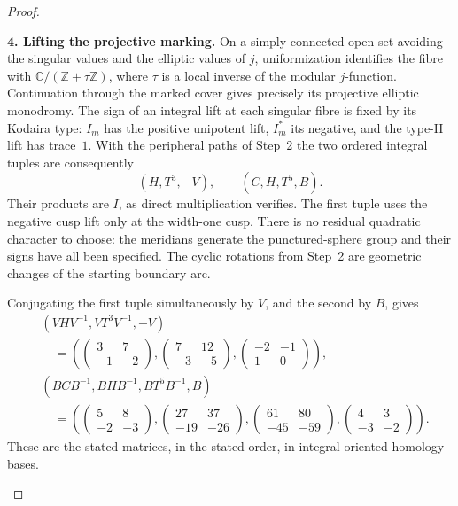 \begin{proof}
\begin{enumerate}[label=\arabic*.,leftmargin=*]
\par\medskip\noindent\textbf{4. Lifting the projective marking.}\quad 
On a simply connected open set avoiding the singular values and
the elliptic values of $j$, uniformization identifies the fibre
with $\mathbb C/(\mathbb Z+\tau\mathbb Z)$, where $\tau$ is a
local inverse of the modular $j$-function.  Continuation through
the marked cover gives precisely its projective elliptic
monodromy.  The sign of an integral lift at each singular fibre
is fixed by its Kodaira type: $I_m$ has the positive unipotent
lift, $I_m^*$ its negative, and the type-II lift has trace~$1$.
With the peripheral paths of Step~2 the two ordered integral
tuples are consequently
\[
 (H,T^3,-V),\qquad (C,H,T^5,B).
\]
Their products are $I$, as direct multiplication verifies.  The
first tuple uses the negative cusp lift only at the width-one
cusp.  There is no residual quadratic character to choose: the
meridians generate the punctured-sphere group and their signs
have all been specified.  The cyclic rotations from Step~2
are geometric changes of the starting boundary arc.

Conjugating the first tuple simultaneously by $V$, and the second
by $B$, gives
\[
\begin{aligned}
 &(VHV^{-1},VT^3V^{-1},-V)\\[-1pt]
 &\quad=\left(
 \begin{pmatrix}3&7\\-1&-2\end{pmatrix},
 \begin{pmatrix}7&12\\-3&-5\end{pmatrix},
 \begin{pmatrix}-2&-1\\1&0\end{pmatrix}\right),\\
 &(BCB^{-1},BHB^{-1},BT^5B^{-1},B)\\[-1pt]
 &\quad=\left(
 \begin{pmatrix}5&8\\-2&-3\end{pmatrix},
 \begin{pmatrix}27&37\\-19&-26\end{pmatrix},
 \begin{pmatrix}61&80\\-45&-59\end{pmatrix},
 \begin{pmatrix}4&3\\-3&-2\end{pmatrix}\right).
\end{aligned}
\]
These are the stated matrices, in the stated order, in integral
oriented homology bases.


\end{enumerate}
\end{proof}
